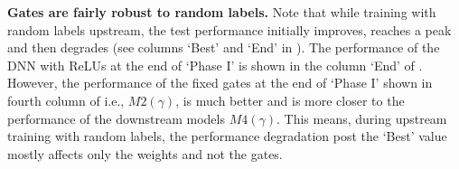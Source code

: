 \textbf{Gates are fairly robust to random labels.} Note that while training with random labels upstream, the test performance initially improves, reaches a peak and then degrades (see columns `Best' and `End' in ). The performance of the DNN with ReLUs at the end of `Phase I' is shown in the column `End' of . However, the performance of the fixed gates at the end of `Phase I' shown in fourth column of  i.e., $M2(\gamma)$, is much better and is more closer to the performance of the downstream models $M4(\gamma)$. This means, during upstream training with random labels, the performance degradation post the `Best' value mostly affects only the weights and not the gates.

